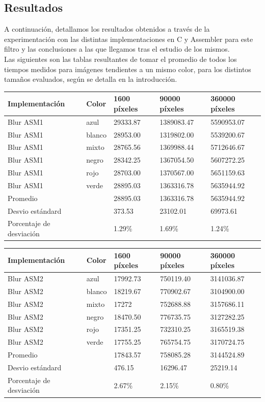 \subsection{Resultados}
A continuación, detallamos los resultados obtenidos a través de la experimentación con las distintas implementaciones en C y Assembler para este filtro y las conclusiones a las que llegamos tras el estudio de los mismos.\\
Las siguientes son las tablas resultantes de tomar el promedio de todos los tiempos medidos para imágenes tendientes a un mismo color, para los distintos tamaños evaluados, según se detalla en la introducción.\\

\begin{tabular}{| l | l | l | l | l |}
\hline
Implementación & Color & 1600 píxeles & 90000 píxeles & 360000 píxeles\\
\hline
Blur ASM1 & azul & 29333.87 & 1389083.47&  5590953.07\\ 
\hline
Blur ASM1 & blanco & 28953.00&  1319802.00 & 5539200.67\\ 
\hline
Blur ASM1 & mixto & 28765.56  &1369988.44  & 5712646.67\\ 
\hline
Blur ASM1 & negro & 28342.25  &1367054.50  & 5607272.25\\
\hline
Blur ASM1 & rojo & 28703.00  &1370567.00  & 5651159.63\\
\hline
Blur ASM1 & verde & 28895.03  &1363316.78  & 5635944.92\\ 
\hline
Promedio & &  28895.03  &1363316.78 & 5635944.92\\
\hline
Desvio estándard  && 373.53  &23102.01 &  69973.61\\
\hline
Porcentaje de desviación  && 1.29\%& 1.69\%& 1.24\%\\
\hline
\end{tabular}

\begin{tabular}{| l | l | l | l | l |}
\hline
Implementación & Color & 1600 píxeles & 90000 píxeles & 360000 píxeles\\
\hline
Blur ASM2 & azul & 17992.73 &  750119.40&  3141036.87\\ 
\hline
Blur ASM2 & blanco & 18219.67  & 770902.67 & 3104900.00\\ 
\hline
Blur ASM2 & mixto &  17272 & 752688.88 & 3157686.11\\ 
\hline
Blur ASM2 & negro & 18470.50  & 776735.75 & 3127282.25\\
\hline
Blur ASM2 & rojo & 17351.25 &  732310.25 & 3165519.38\\
\hline
Blur ASM2 & verde & 17755.25 & 765754.75 & 3170724.75\\ 
\hline
Promedio & &  17843.57  & 758085.28 & 3144524.89\\
\hline
Desvio estándard  && 476.15  & 16296.47  & 25219.14\\
\hline
Porcentaje de desviación  && 2.67\% & 2.15\% & 0.80\%\\
\hline
\end{tabular}

